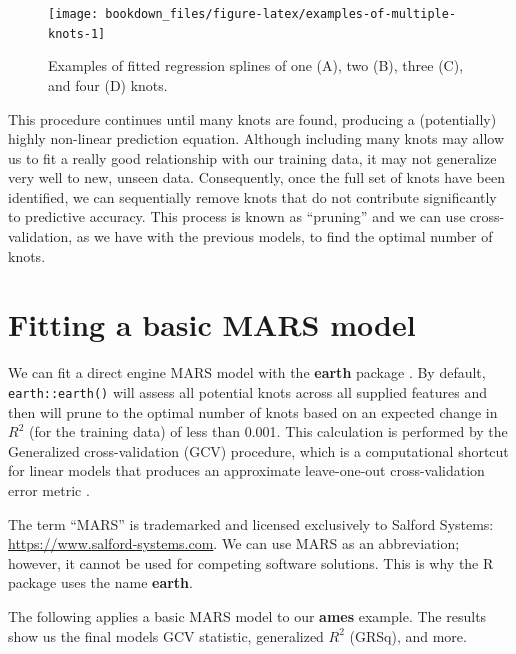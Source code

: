 \documentclass[]{krantz}
\makeatletter
\newenvironment{kframe}{%
\medskip{}
\setlength{\fboxsep}{.8em}
 \def\at@end@of@kframe{}%
 \ifinner\ifhmode%
  \def\at@end@of@kframe{\end{minipage}}%
  \begin{minipage}{\columnwidth}%
 \fi\fi%
 \def\FrameCommand##1{\hskip\@totalleftmargin \hskip-\fboxsep
 \colorbox{shadecolor}{##1}\hskip-\fboxsep
     \hskip-\linewidth \hskip-\@totalleftmargin \hskip\columnwidth}%
 \MakeFramed {\advance\hsize-\width
   \@totalleftmargin\z@ \linewidth\hsize
   \@setminipage}}%
 {\par\unskip\endMakeFramed%
 \at@end@of@kframe}
\newenvironment{block}[1]
  {
  \begin{itemize}
  \renewcommand{\labelitemi}{
    \raisebox{-.7\height}[0pt][0pt]{
      {\setkeys{Gin}{width=3em,keepaspectratio}\texttt{[image: icons/\#1]}}
    }
  }
  \setlength{\fboxsep}{1em}
  \begin{kframe}
  \item
  }
  {
  \end{kframe}
  \end{itemize}
  }
\newenvironment{note}
  {\begin{block}{note}}
  {\end{block}}
\makeatother
\begin{document}
\begin{figure}

{\centering \texttt{[image: bookdown\_files/figure-latex/examples-of-multiple-knots-1]} 

}

\caption{Examples of fitted regression splines of one (A), two (B), three (C), and four (D) knots.}\label{fig:examples-of-multiple-knots}
\end{figure}

This procedure continues until many knots are found, producing a (potentially) highly non-linear prediction equation. Although including many knots may allow us to fit a really good relationship with our training data, it may not generalize very well to new, unseen data. Consequently, once the full set of knots have been identified, we can sequentially remove knots that do not contribute significantly to predictive accuracy. This process is known as ``pruning'' and we can use cross-validation, as we have with the previous models, to find the optimal number of knots.

\hypertarget{fitting-a-basic-mars-model}{%
\section{Fitting a basic MARS model}\label{fitting-a-basic-mars-model}}

We can fit a direct engine MARS model with the \textbf{earth} package \citep{R-earth}. By default, \texttt{earth::earth()} will assess all potential knots across all supplied features and then will prune to the optimal number of knots based on an expected change in \(R^2\) (for the training data) of less than 0.001. This calculation is performed by the Generalized cross-validation (GCV) procedure, which is a computational shortcut for linear models that produces an approximate leave-one-out cross-validation error metric \citep{golub1979generalized}.

\begin{note}
The term ``MARS'' is trademarked and licensed exclusively to Salford
Systems: \url{https://www.salford-systems.com}. We can use MARS as an
abbreviation; however, it cannot be used for competing software
solutions. This is why the R package uses the name \textbf{earth}.
\end{note}

The following applies a basic MARS model to our \textbf{ames} example. The results show us the final models GCV statistic, generalized \(R^2\) (GRSq), and more.
\end{document}
